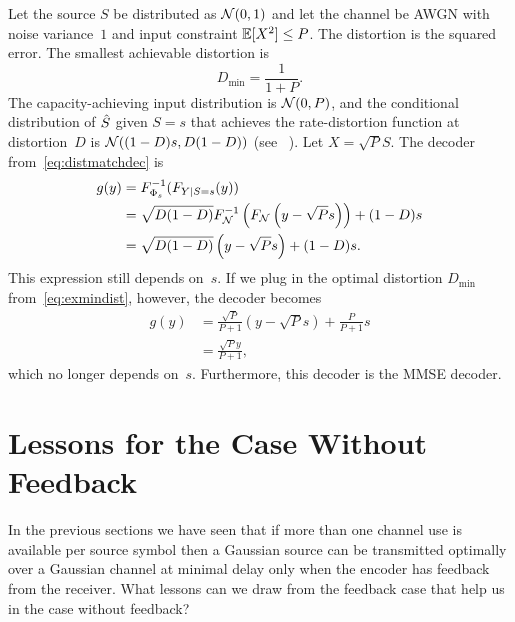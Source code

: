 \begin{example}
  Let the source $S$ be distributed as ${\mathcal{N}}(0,1)$ and let the channel be AWGN
  with noise variance~$1$ and input constraint $\mathbb{E}[X^2] \le P$.
  The distortion is the squared error. The smallest achievable distortion is
  \begin{equation}
    \label{eq:exmindist}
    D_{\min} = \frac{1}{1 + P}.
  \end{equation}
  The capacity-achieving input distribution is ${\mathcal{N}}(0,P)$, and the conditional
  distribution of ${\hat{S}}$ given $S=s$ that achieves the rate-distortion function
  at distortion~$D$ is ${\mathcal{N}}((1-D)s, D(1-D))$ (see \eg~\cite{CoverT1991}).
  Let $X = \sqrt{P}S$.  The decoder from~\eqref{eq:distmatchdec} is
  \begin{align*}
    g(y) &= F_{\Phi_s}^{-1} (F_{Y|S=s}(y)) \\
    &= \sqrt{D(1-D)} F_{{\mathcal{N}}}^{-1} \left( F_{{\mathcal{N}}}\left( y-\sqrt{P}s
    \right) \right) + (1-D)s \\
    &= \sqrt{D(1-D)} \left( y-\sqrt{P}s \right) + (1-D)s.
  \end{align*}
  This expression still depends on~$s$. If we plug in the optimal distortion
  $D_{\min}$ from~\eqref{eq:exmindist}, however, the decoder becomes
  \begin{align*}
    g(y) &= \frac{\sqrt{P}}{P+1} (y - \sqrt{P}s) + \frac{P}{P +
    1}s \\ 
    &= \frac{\sqrt{P}y}{P + 1},
  \end{align*}
  which no longer depends on~$s$. Furthermore, this decoder is the MMSE decoder.
\end{example}


\section{Lessons for the Case Without Feedback}\label{sec:lessonsfromfeedback}

In the previous sections we have seen that if more than one channel use is
available per source symbol then a Gaussian source can be transmitted optimally
over a Gaussian channel at minimal delay only when the encoder has feedback from
the receiver.  What lessons can we draw from the feedback case that help us in
the case without feedback?

